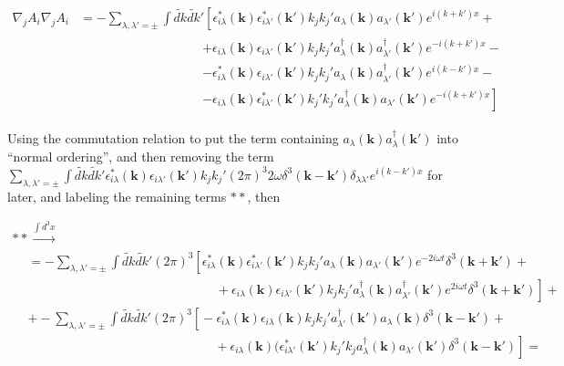 \documentclass[twoside]{amsart}
\begin{document}
\[
\begin{aligned}
  \nabla_j A_i \nabla_j A_i & = - \sum_{\lambda, \lambda'= \pm} \int \widetilde{dk} \widetilde{dk}' \left[ \right. \epsilon^*_{i\lambda}(\mathbf{k}) \epsilon_{i\lambda'}^*(\mathbf{k}') k_j k_j' a_{\lambda}(\mathbf{k}) a_{\lambda'}(\mathbf{k}') e^{i(k +k') x} + \\
    & \phantom{- \sum_{\lambda, \lambda'= \pm} \int \widetilde{dk} \widetilde{dk}' } \begin{aligned} 
& + \epsilon_{i\lambda}(\mathbf{k}) \epsilon_{i\lambda'}(\mathbf{k}') k_j k_j' a^{\dag}_{\lambda}(\mathbf{k}) a^{\dag}_{\lambda'}(\mathbf{k}') e^{-i(k +k') x} - \\
   & -    \epsilon^*_{i\lambda}(\mathbf{k}) \epsilon_{i\lambda'}(\mathbf{k}') k_j k_j' a_{\lambda}(\mathbf{k}) a^{\dag}_{\lambda'}(\mathbf{k}') e^{i(k -k') x} -    \\
      & - \epsilon_{i\lambda}(\mathbf{k}) \epsilon_{i\lambda'}^*(\mathbf{k}') k_j' k_j' a_{\lambda}^{\dag}(\mathbf{k}) a_{\lambda'}(\mathbf{k}') e^{-i(k +k') x} \left. \right] 
\end{aligned}
\end{aligned}
\]

Using the commutation relation to put the term containing $a_{\lambda}(\mathbf{k})a_{\lambda}^{\dag}(\mathbf{k}')$ into ``normal ordering'', and then removing the term $ \sum_{\lambda, \lambda'= \pm} \int \widetilde{dk} \widetilde{dk}'  \epsilon^*_{i\lambda}(\mathbf{k}) \epsilon_{i\lambda'}(\mathbf{k}') k_j k_j' (2\pi)^3 2\omega \delta^3(\mathbf{k}- \mathbf{k}') \delta_{\lambda \lambda'}  e^{i(k -k') x}$ for later, and labeling the remaining terms $**$, then

\[
\begin{gathered}
  ** \xrightarrow{ \int d^3x} \\ 
  \begin{aligned}
    & = - \sum_{\lambda, \lambda'= \pm} \int \widetilde{dk} \widetilde{dk}' (2\pi)^3 \left[ \right. \epsilon^*_{i\lambda}(\mathbf{k}) \epsilon_{i\lambda'}^*(\mathbf{k}') k_j k_j' a_{\lambda}(\mathbf{k}) a_{\lambda'}(\mathbf{k}') e^{-2i\omega t} \delta^3(\mathbf{k} + \mathbf{k}') + \\
    & \phantom{ = - \sum_{\lambda, \lambda'= \pm} \int \widetilde{dk} \widetilde{dk}' (2\pi)^3 ( ) } 
 + \epsilon_{i\lambda}(\mathbf{k}) \epsilon_{i\lambda'}(\mathbf{k}') k_j k_j' a^{\dag}_{\lambda}(\mathbf{k}) a^{\dag}_{\lambda'}(\mathbf{k}') e^{2i\omega t} \delta^3(\mathbf{k} + \mathbf{k}') \left. \right] + \\
    & + - \sum_{\lambda, \lambda' = \pm} \int \widetilde{dk} \widetilde{dk}' (2\pi)^3 \left[ \right. - \epsilon_{i\lambda}^*(\mathbf{k}) \epsilon_{i\lambda}(\mathbf{k}) k_j k_j' a_{\lambda'}^{\dag}(\mathbf{k}') a_{\lambda}(\mathbf{k}) \delta^3(\mathbf{k}- \mathbf{k}') +  \\
      & \phantom{ + - \sum_{\lambda, \lambda' = \pm} \int \widetilde{dk} \widetilde{dk}' (2\pi)^3 ( ) } + \epsilon_{i\lambda}(\mathbf{k})(\epsilon_{i\lambda'}^*(\mathbf{k}') k_j' k_j a_{\lambda}^{\dag}(\mathbf{k})a_{\lambda'}(\mathbf{k}') \delta^3(\mathbf{k}-  \mathbf{k}') \left. \right] = 
  \end{aligned}
\end{gathered}
\]
\end{document}
